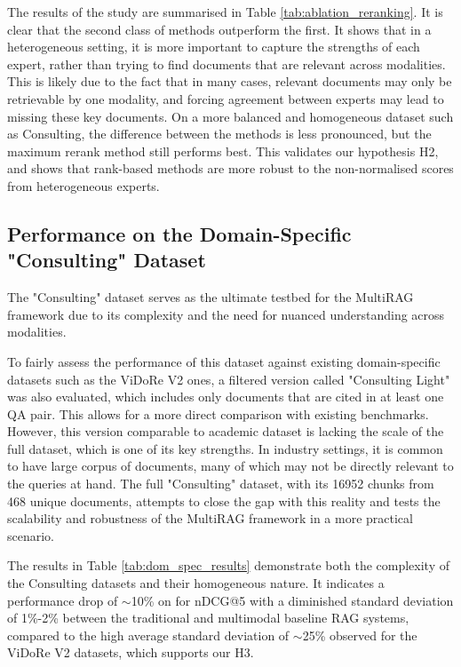 \documentclass[12pt,twoside]{report}
\begin{document}
The results of the study are summarised in Table \ref{tab:ablation_reranking}. It is clear that the second class of methods outperform the first. It shows that in a heterogeneous setting, it is more important to capture the strengths of each expert, rather than trying to find documents that are relevant across modalities. This is likely due to the fact that in many cases, relevant documents may only be retrievable by one modality, and forcing agreement between experts may lead to missing these key documents. On a more balanced and homogeneous dataset such as Consulting, the difference between the methods is less pronounced, but the maximum rerank method still performs best. This validates our hypothesis H2, and shows that rank-based methods are more robust to the non-normalised scores from heterogeneous experts.

\subsection{Performance on the Domain-Specific "Consulting" Dataset} \label{sec:consulting_results}

The "Consulting" dataset serves as the ultimate testbed for the MultiRAG framework due to its complexity and the need for nuanced understanding across modalities.

To fairly assess the performance of this dataset against existing domain-specific datasets such as the ViDoRe V2 ones, a filtered version called "Consulting Light" was also evaluated, which includes only documents that are cited in at least one QA pair. This allows for a more direct comparison with existing benchmarks. However, this version comparable to academic dataset is lacking the scale of the full dataset, which is one of its key strengths. In industry settings, it is common to have large corpus of documents, many of which may not be directly relevant to the queries at hand. The full "Consulting" dataset, with its 16952 chunks from 468 unique documents, attempts to close the gap with this reality and tests the scalability and robustness of the MultiRAG framework in a more practical scenario.

The results in Table \ref{tab:dom_spec_results} demonstrate both the complexity of the Consulting datasets and their homogeneous nature. It indicates a performance drop of $\sim$10\% on for nDCG@5 with a diminished standard deviation of 1\%-2\% between the traditional and multimodal baseline RAG systems, compared to the high average standard deviation of $\sim$25\% observed for the ViDoRe V2 datasets, which supports our H3.
\end{document}
